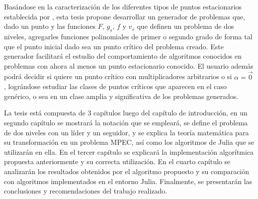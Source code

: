 Basándose en la caracterización de los diferentes tipos de puntos estacionarios establecida por \cite{Flegel2003AFJ}, esta tesis propone desarrollar un generador de problemas que, dado un punto y las funciones $F$, $g_s$, $f$ y $v_s$  que definen un problema de dos niveles, agregarles funciones polinomiales de primer o segundo grado de forma tal que el punto inicial dado sea un punto crítico del problema creado. 
Este generador facilitará el estudio del comportamiento de algoritmos conocidos en problemas con ahora al menos un punto estacionario conocido.
El usuario además podrá decidir si quiere un punto crítico con multiplicadores arbitrarios o si $\alpha = \vec{0}$, lográndose estudiar las clases de puntos críticos que aparecen en el caso genérico, o sea en un clase amplia y significativa de los problemas generados.



La tesis está compuesta de 3 capítulos luego del capítulo de introducción, en un segundo capítulo 
se mostrará la notación que se empleará, se define el problema de dos niveles con un líder y un seguidor, y se explica la teoría matemática para su transformación en un problema MPEC, así como los algoritmos de Julia que se utilizarán en ella.
En el tercer capítulo se explicará la implementación algorítmica propuesta anteriormente y su correcta utilización. 
En el cuarto capítulo se analizarán los resultados obtenidos por el algoritmo propuesto y su comparación con algoritmos implementados en el entorno Julia.
Finalmente, se presentarán las conclusiones y recomendaciones del trabajo realizado.